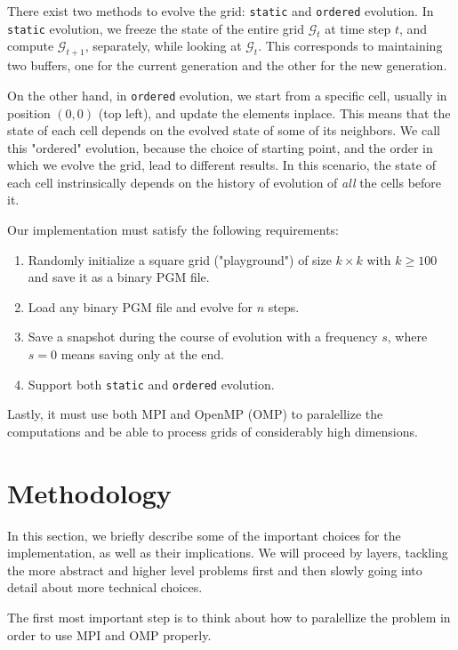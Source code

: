 \documentclass{report}
\begin{document}
There exist two methods to evolve the grid: \texttt{static} and \texttt{ordered}
evolution. In \texttt{static} evolution, we freeze the state of the entire grid 
$\mathcal{G}_t$ at time step $t$, and compute $\mathcal{G}_{t+1}$, separately, 
while looking at $\mathcal{G}_t$. This corresponds to maintaining two buffers, 
one for the current generation and the other for the new generation.

On the other hand, in \texttt{ordered} evolution, we start from a specific cell, 
usually in position $(0,0)$ (top left), and update the elements inplace. This 
means that the state of each cell depends on the evolved state of some of its 
neighbors. We call this "ordered" evolution, because the choice of starting 
point, and the order in which we evolve the grid, lead to different results.
In this scenario, the state of each cell instrinsically depends on the history of 
evolution of \textit{all} the cells before it. 

Our implementation must satisfy the following requirements: 

\begin{enumerate}
    \item Randomly initialize a square grid ("playground") of size $k \times k$ 
        with $k \geq 100$ and save it as a binary PGM\cite{pgm} file.
    \item Load any binary PGM file and evolve for $n$ steps.
    \item Save a snapshot during the course of evolution with a frequency $s$, 
        where $s=0$ means saving only at the end. 
    \item Support both \texttt{static} and \texttt{ordered} evolution.
\end{enumerate}

Lastly, it must use both MPI\cite{mpi} and OpenMP\cite{omp} (OMP) to paralellize 
the computations and be able to process grids of considerably high dimensions. 

\section{Methodology}

In this section, we briefly describe some of the important choices for the 
implementation, as well as their implications. We will proceed by layers, 
tackling the more abstract and higher level problems first and then slowly 
going into detail about more technical choices. 

The first most important step is to think about how to paralellize the problem 
in order to use MPI and OMP properly.
\end{document}

